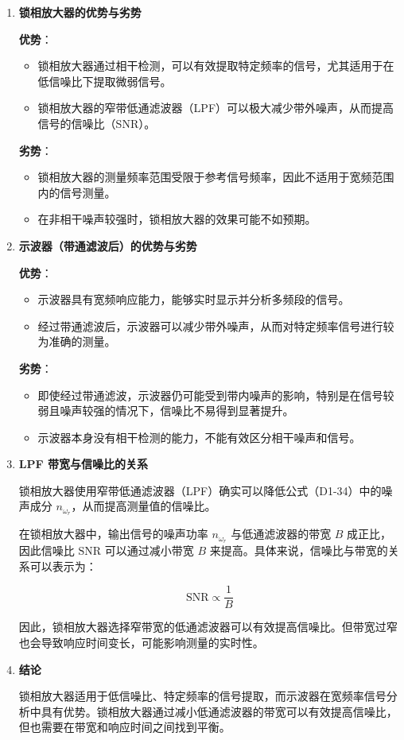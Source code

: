 \documentclass[dvipsnames, svgnames,a4paper,11pt]{article}
\begin{document}
	\begin{enumerate}

		\item \textbf{锁相放大器的优势与劣势}

		\textbf{优势}：
		\begin{itemize}
			\item 锁相放大器通过相干检测，可以有效提取特定频率的信号，尤其适用于在低信噪比下提取微弱信号。
			\item 锁相放大器的窄带低通滤波器（LPF）可以极大减少带外噪声，从而提高信号的信噪比（SNR）。
		\end{itemize}

		\textbf{劣势}：
		\begin{itemize}
			\item 锁相放大器的测量频率范围受限于参考信号频率，因此不适用于宽频范围内的信号测量。
			\item 在非相干噪声较强时，锁相放大器的效果可能不如预期。
		\end{itemize}

		\item \textbf{示波器（带通滤波后）的优势与劣势}

		\textbf{优势}：
		\begin{itemize}
			\item 示波器具有宽频响应能力，能够实时显示并分析多频段的信号。
			\item 经过带通滤波后，示波器可以减少带外噪声，从而对特定频率信号进行较为准确的测量。
		\end{itemize}

		\textbf{劣势}：
		\begin{itemize}
			\item 即使经过带通滤波，示波器仍可能受到带内噪声的影响，特别是在信号较弱且噪声较强的情况下，信噪比不易得到显著提升。
			\item 示波器本身没有相干检测的能力，不能有效区分相干噪声和信号。
		\end{itemize}

		\item \textbf{LPF 带宽与信噪比的关系}

		锁相放大器使用窄带低通滤波器（LPF）确实可以降低公式（D1-34）中的噪声成分 $n_{\omega_r}$，从而提高测量值的信噪比。

		在锁相放大器中，输出信号的噪声功率 $n_{\omega_r}$ 与低通滤波器的带宽 $B$ 成正比，因此信噪比 $\text{SNR}$ 可以通过减小带宽 $B$ 来提高。具体来说，信噪比与带宽的关系可以表示为：

		\[
		\text{SNR} \propto \frac{1}{B}
		\]

		因此，锁相放大器选择窄带宽的低通滤波器可以有效提高信噪比。但带宽过窄也会导致响应时间变长，可能影响测量的实时性。

		\item \textbf{结论}

		锁相放大器适用于低信噪比、特定频率的信号提取，而示波器在宽频率信号分析中具有优势。锁相放大器通过减小低通滤波器的带宽可以有效提高信噪比，但也需要在带宽和响应时间之间找到平衡。

	\end{enumerate}
\end{document}
